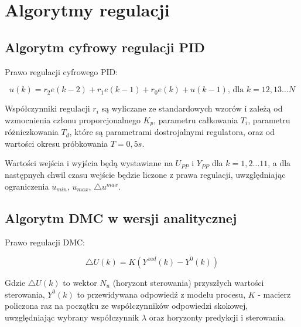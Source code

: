 \chapter{Algorytmy regulacji}

\section{Algorytm cyfrowy regulacji PID}

Prawo regulacji cyfrowego PID:

\begin{equation}
u(k)=r_2e(k-2) + r_1e(k-1) + r_0e(k) + u(k-1) \textrm{, dla } k=12, 13  \ldots N
\label{control_rule}
\end{equation}

Współczynniki regulacji $r_i$ są wyliczane ze standardowych wzorów i zależą od wzmocnienia członu proporcjonalnego $K_p$, parametru całkowania $T_i$, parametru różniczkowania $T_d$, które są parametrami dostrojalnymi regulatora, oraz od wartości okresu próbkowania $T = 0,5s$.

Wartości wejścia i wyjścia będą wystawiane na $U_{PP}$ i $Y_{PP}$ dla $k = 1,2 \ldots 11 $, a dla następnych chwil czasu wejście będzie liczone z prawa regulacji, uwzględniając ograniczenia $u_{min}$, $u_{max}$, $\triangle u^{max}$.

\section{Algorytm DMC w wersji analitycznej}

Prawo regulacji DMC:

\begin{equation}
\triangle U(k)=K(Y^{zad}(k)-Y^0(k))
\end{equation}

Gdzie $\triangle U(k)$ to wektor $N_u$ (horyzont sterowania) przyszłych wartości sterowania, $Y^0(k)$ to przewidywana odpowiedź z modelu procesu, $K$ - macierz policzona raz na początku ze współczynników odpowiedzi skokowej, uwzględniając wybrany współczynnik $\lambda$ oraz horyzonty predykcji i sterowania.

